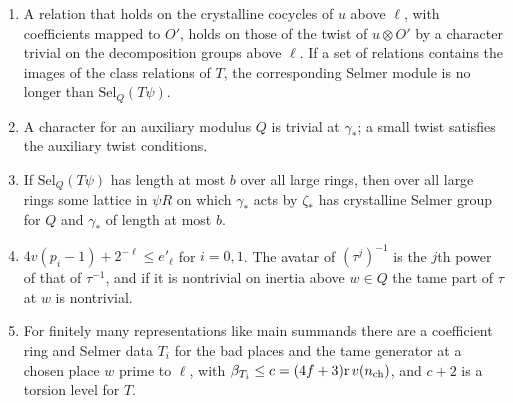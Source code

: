 \begin{lemma}\label{lem:twisting-transfer}
\begin{enumerate}[label=\textup{(\alph*)}]
\item A relation that holds on the crystalline cocycles of $u$ above $\ell$, with coefficients mapped to $O'$, holds on those of the twist of $u\otimes O'$ by a character trivial on the decomposition groups above $\ell$. If a set of relations contains the images of the class relations of $T$, the corresponding Selmer module is no longer than $\mathrm{Sel}_Q(T\psi)$.
\item A character for an auxiliary modulus $Q$ is trivial at $\gamma_*$; a small twist satisfies the auxiliary twist conditions.
\item If $\mathrm{Sel}_Q(T\psi)$ has length at most $b$ over all large rings, then over all large rings some lattice in $\psi R$ on which $\gamma_*$ acts by $\zeta_*$ has crystalline Selmer group for $Q$ and $\gamma_*$ of length at most $b$.
\item $4v(p_i-1)+2^{-\ell}\le e'_\ell$ for $i=0,1$. The avatar of $(\tau^j)^{-1}$ is the $j$th power of that of $\tau^{-1}$, and if it is nontrivial on inertia above $w\in Q$ the tame part of $\tau$ at $w$ is nontrivial.
\item For finitely many representations like main summands there are a coefficient ring and Selmer data $T_i$ for the bad places and the tame generator at a chosen place $w$ prime to $\ell$, with $\beta_{T_i}\le c=(4f+3)\mathrm r\,v(n_{\rm ch})$, and $c+2$ is a torsion level for $T$.
\end{enumerate}
\end{lemma}

